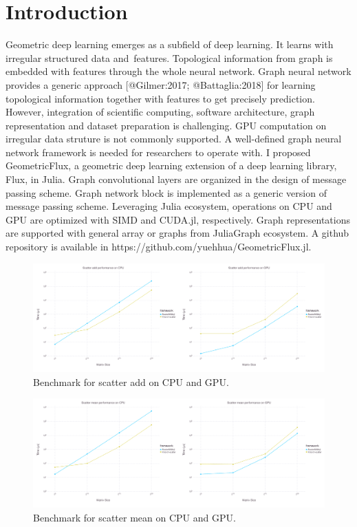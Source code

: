 \documentclass{juliacon}
\begin{document}
\section{Introduction}

Geometric deep learning emerges as a subfield of deep learning. It learns with irregular
structured data and features. Topological information from graph is embedded with features
through the whole neural network. Graph neural network provides a generic approach [@Gilmer:2017; @Battaglia:2018]
for learning topological information together with features to get precisely prediction.
However, integration of scientific computing, software architecture, graph representation
and dataset preparation is challenging. GPU computation on irregular data struture is not
commonly supported. A well-defined graph neural network framework is needed for researchers
to operate with. I proposed GeometricFlux, a geometric deep learning extension of a deep learning
library, Flux, in Julia. Graph convolutional layers are organized in the design of message
passing scheme. Graph network block is implemented as a generic version of message passing
scheme. Leveraging Julia ecosystem, operations on CPU and GPU are optimized with SIMD and
CUDA.jl, respectively. Graph representations are supported with general array or graphs from
JuliaGraph ecosystem.
A github repository is available in https://github.com/yuehhua/GeometricFlux.jl.

\begin{figure}[t]
\centerline{\includegraphics[width=18cm]{figures/scatter_add.svg}}
\caption{Benchmark for scatter add on CPU and GPU.}
    \label{fig:scatter_add}
\end{figure}

\begin{figure}[h]
\centerline{\includegraphics[width=18cm]{figures/scatter_mean.svg}}
\caption{Benchmark for scatter mean on CPU and GPU.}
    \label{fig:scatter_mean}
\end{figure}
\end{document}

